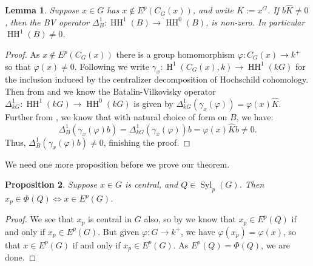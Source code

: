 \documentclass{amsart}
\theoremstyle{plain}\newtheorem{theorem}{Theorem}[section]
\theoremstyle{plain}\newtheorem{conjecture}[theorem]{Conjecture}
\theoremstyle{plain}\newtheorem{corollary}[theorem]{Corollary}
\theoremstyle{plain}\newtheorem{lemma}[theorem]{Lemma}
\theoremstyle{plain}\newtheorem{proposition}[theorem]{Proposition}
\theoremstyle{plain}\newtheorem{statement}[theorem]{}
\theoremstyle{definition}\newtheorem{definition}[theorem]{Definition}
\theoremstyle{definition}\newtheorem{example}[theorem]{Example}
\theoremstyle{definition}\newtheorem{examples}[theorem]{Examples}
\theoremstyle{definition}\newtheorem{notation}[theorem]{Notation}
\theoremstyle{definition}\newtheorem{remark}[theorem]{Remark}
\theoremstyle{definition}\newtheorem{remarks}[theorem]{Remarks}
\theoremstyle{definition}\newtheorem{question}[theorem]{Question}
\theoremstyle{definition}\newtheorem{propositiondefinition}[theorem]{Definition/Proposition}
\DeclareMathOperator{\HH}{HH}
\begin{document}
\begin{lemma}\label{bvnonvan} Suppose $x \in G$ has $x \not \in E^p(C_G(x))$, and write $K := x^G$. If $b\hat{K} \not=0 $, then the BV operator $\Delta_B^{1} \colon\operatorname{HH}^1(B) \rightarrow \HH^0(B)$, is non-zero. In particular $\HH^1(B)\not=0$.
\end{lemma}
\begin{proof}
    As $x \not \in E^p(C_G(x))$ there is a group homomorphism $\varphi: C_G(x) \rightarrow k^+$ so that $\varphi(x) \not=0$. Following \cite[Proposition 2.3]{BR} we write $\gamma_x :\operatorname{H}^1(C_G(x),k) \rightarrow \HH^1(kG)$ for the inclusion induced by the centralizer decomposition of Hochschild cohomology. Then from \cite[Theorem 1.1 (ix)]{BKL} and \cite[Proposition 2.3]{BR} we know the Batalin-Vilkovisky operator $\Delta_{kG}^1:\operatorname{HH}^1(kG) \rightarrow \operatorname{HH}^{0}(kG)$ is given by $\Delta_{kG}^1(\gamma_x(\varphi)) = \varphi(x)\hat{K}$. Further from \cite[Proposition 2.6]{BR}, we know that with natural choice of form on $B$, we have: $$\Delta_B^1( \gamma_x (\varphi)b) = \Delta_{kG}^1(\gamma_x(\varphi))b = \varphi(x)\hat{K}b \not=0.$$
    Thus, $\Delta_B^1(\gamma_x(\varphi)b) \not=0$, finishing the proof.
\end{proof}
We need one more proposition before we prove our theorem. 
\begin{proposition}\label{phipep} Suppose $x \in G$ is central, and $Q \in \operatorname{Syl}_p(G)$. Then $x_p \in \Phi(Q) \iff  x\in E^p(G)$.
\end{proposition}
\begin{proof}
   We see that $x_p$ is central in $G$ also, so by \cite[Lemma 3.8]{BR} we know that $x_p \in E^p(Q)$ if and only if $x_p \in E^p(G)$. But given $\varphi:G \rightarrow k^+$, we have $\varphi(x_p) = \varphi(x)$, so that $x \in E^p(G)$ if and only if $x_p \in E^p(G)$. As $E^p(Q) = \Phi(Q)$, we are done.
\end{proof}
\end{document}
